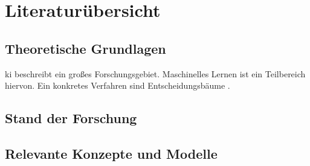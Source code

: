 \chapter{Literaturübersicht}

\section{Theoretische Grundlagen}

\Gls{ki} beschreibt ein großes Forschungsgebiet. Maschinelles Lernen ist ein Teilbereich hiervon. Ein konkretes Verfahren sind Entscheidungsbäume \autocite{knuth_2021}.

\lipsum[1-2]

\section{Stand der Forschung}

\lipsum[2]

\section{Relevante Konzepte und Modelle}

\lipsum[3-5]

